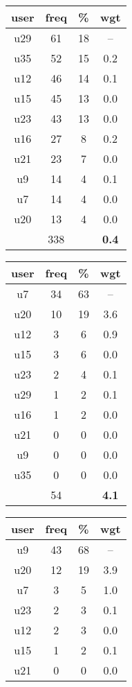 \begin{appendices}
\begin{table}
\begin{tabular}{ |c|c|c|c| }
	\hline
	\textbf{user} & \textbf{freq} & \textbf{\%} & \textbf{wgt} \\
	\hline
	u29 & 61 & 18 & -- \\
	u35 & 52 & 15 & 0.2 \\
	u12 & 46 & 14 & 0.1 \\
	u15 & 45 & 13 & 0.0 \\
	u23 & 43 & 13 & 0.0 \\
	u16 & 27 & 8 & 0.2 \\
	u21 & 23 & 7 & 0.0 \\
	u9 & 14 & 4 & 0.1 \\
	u7 & 14 & 4 & 0.0 \\
	u20 & 13 & 4 & 0.0 \\
	 & 338 & & \textbf{0.4} \\
	\hline
\end{tabular}
\begin{tabular}{ |c|c|c|c| }
	\hline
	\textbf{user} & \textbf{freq} & \textbf{\%} & \textbf{wgt} \\
	\hline
	u7 & 34 & 63 & -- \\
	u20 & 10 & 19 & 3.6 \\
	u12 & 3 & 6 & 0.9 \\
	u15 & 3 & 6 & 0.0 \\
	u23 & 2 & 4 & 0.1 \\
	u29 & 1 & 2 & 0.1 \\
	u16 & 1 & 2 & 0.0 \\
	u21 & 0 & 0 & 0.0 \\
	u9 & 0 & 0 & 0.0 \\
	u35 & 0 & 0 & 0.0 \\
	 & 54 & & \textbf{4.1} \\
	\hline
\end{tabular}
\begin{tabular}{ |c|c|c|c| }
	\hline
	\textbf{user} & \textbf{freq} & \textbf{\%} & \textbf{wgt} \\
	\hline
	u9 & 43 & 68 & -- \\
	u20 & 12 & 19 & 3.9 \\
	u7 & 3 & 5 & 1.0 \\
	u23 & 2 & 3 & 0.1 \\
	u12 & 2 & 3 & 0.0 \\
	u15 & 1 & 2 & 0.1 \\
	u21 & 0 & 0 & 0.0 \\

\end{tabular}
\end{table}
\end{appendices}
